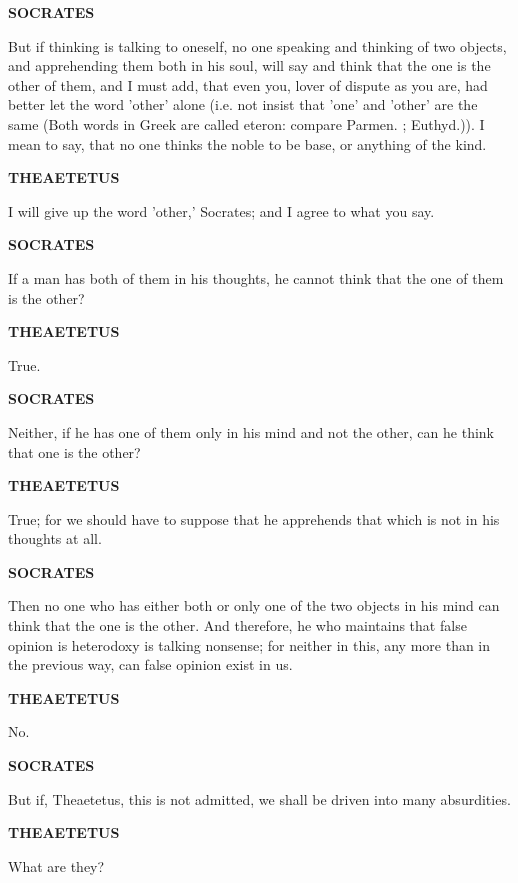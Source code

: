 \documentclass[11pt,letter]{article}
\begin{document}
\par \textbf{SOCRATES}
\par   But if thinking is talking to oneself, no one speaking and thinking of two objects, and apprehending them both in his soul, will say and think that the one is the other of them, and I must add, that even you, lover of dispute as you are, had better let the word 'other' alone (i.e. not insist that 'one' and 'other' are the same (Both words in Greek are called eteron:  compare Parmen. ; Euthyd.)). I mean to say, that no one thinks the noble to be base, or anything of the kind.

\par \textbf{THEAETETUS}
\par   I will give up the word 'other,' Socrates; and I agree to what you say.

\par \textbf{SOCRATES}
\par   If a man has both of them in his thoughts, he cannot think that the one of them is the other?

\par \textbf{THEAETETUS}
\par   True.

\par \textbf{SOCRATES}
\par   Neither, if he has one of them only in his mind and not the other, can he think that one is the other?

\par \textbf{THEAETETUS}
\par   True; for we should have to suppose that he apprehends that which is not in his thoughts at all.

\par \textbf{SOCRATES}
\par   Then no one who has either both or only one of the two objects in his mind can think that the one is the other. And therefore, he who maintains that false opinion is heterodoxy is talking nonsense; for neither in this, any more than in the previous way, can false opinion exist in us.

\par \textbf{THEAETETUS}
\par   No.

\par \textbf{SOCRATES}
\par   But if, Theaetetus, this is not admitted, we shall be driven into many absurdities.

\par \textbf{THEAETETUS}
\par   What are they?
\end{document}
